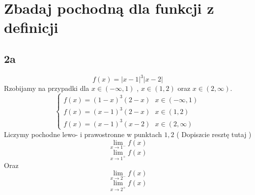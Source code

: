 \documentclass{article}
\begin{document}
\newpage
\section{Zbadaj pochodną dla funkcji z definicji}
\subsection{2a}
$$f(x) = |x-1|^3 |x-2| $$
Rzobijamy na przypadki dla $ x \in (-\infty,1) $ , $x \in (1,2) $ oraz $ x\in (2,\infty) $.
\begin{displaymath}
\begin{cases}
f(x) = (1-x)^3 (2-x) \ \ \ x \in (-\infty,1) \\
f(x) = (x-1)^3 (2-x) \ \ \ x \in (1,2)	\\
f(x) = (x-1)^3 (x-2) \ \ \ x\in (2,\infty)
\end{cases}
\end{displaymath}
Liczymy pochodne lewo- i prawostronne w punktach $1,2$ 
( Dopiszcie resztę tutaj )
$$
\lim_{x \to 1^-}{f(x)}
$$
$$
\lim_{x \to 1^+}{f(x)}
$$
Oraz
$$
\lim_{x \to 2^-}{f(x)}
$$
$$
\lim_{x \to 2^+}{f(x)}
$$
\end{document}
